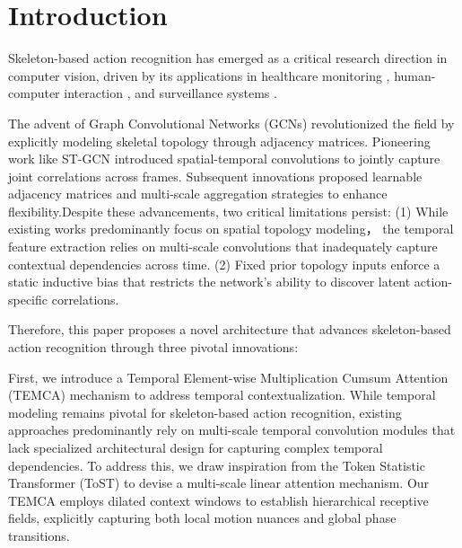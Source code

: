 \section{Introduction}

Skeleton-based action recognition has emerged as a critical research 
direction in computer vision, driven by its applications in healthcare 
monitoring \cite{ref1}, human-computer interaction \cite{ref2}, and surveillance systems \cite{ref3}.



The advent of Graph Convolutional Networks (GCNs) \cite{ref8} revolutionized the field by 
explicitly modeling skeletal topology through adjacency matrices. Pioneering 
work like ST-GCN \cite{ref7} introduced spatial-temporal convolutions to jointly 
capture joint correlations across frames. Subsequent innovations proposed 
learnable adjacency matrices \cite{ref9,ref10} and multi-scale aggregation 
strategies \cite{multiscale} to enhance flexibility.Despite these advancements, 
two critical limitations persist: (1) While existing works predominantly focus on spatial topology modeling，
the temporal feature extraction relies on multi-scale convolutions 
that inadequately capture contextual dependencies across time. (2) Fixed prior topology inputs
enforce a static inductive bias that restricts the network's ability to discover latent action-specific correlations.


Therefore, this paper proposes a novel architecture that advances skeleton-based action recognition through three pivotal innovations:


First, we introduce a Temporal Element-wise Multiplication Cumsum 
Attention (TEMCA) mechanism to address temporal contextualization. 
While temporal modeling remains pivotal for skeleton-based action 
recognition, existing approaches predominantly rely on multi-scale 
temporal convolution modules \cite{ref9,ref10,ref11,ref12} that lack 
specialized architectural design for capturing complex temporal 
dependencies. To address this, we draw inspiration from the Token 
Statistic Transformer (ToST) \cite{tost} to devise a multi-scale linear 
attention mechanism. Our TEMCA employs dilated context windows to 
establish hierarchical receptive fields, explicitly capturing both 
local motion nuances and global phase transitions. 

